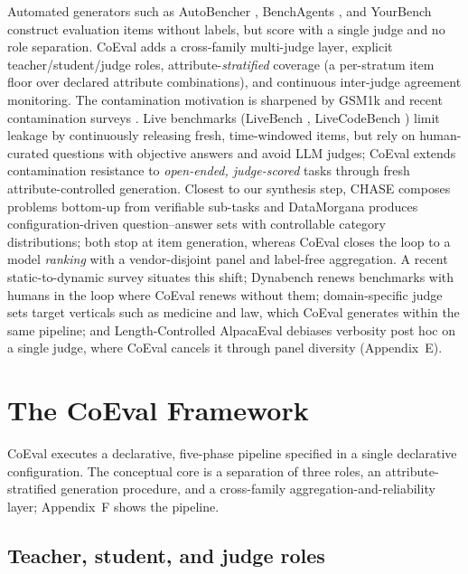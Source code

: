 \documentclass[11pt,a4paper]{article}
\begin{document}
Automated generators such as AutoBencher \citep{ref9}, BenchAgents \citep{ref10}, and YourBench
\citep{ref11} construct evaluation items without labels, but score with a single judge and no role
separation. CoEval adds a cross-family multi-judge layer, explicit teacher/student/judge roles,
attribute-\emph{stratified} coverage (a per-stratum item floor over declared attribute combinations), and continuous
inter-judge agreement monitoring. The contamination motivation is sharpened by GSM1k \citep{ref12} and recent
contamination surveys \citep{ref13}. Live benchmarks (LiveBench \citep{ref22}, LiveCodeBench
\citep{ref23}) limit leakage by continuously releasing fresh, time-windowed items, but rely on
human-curated questions with objective answers and avoid LLM judges; CoEval extends contamination resistance to
\emph{open-ended, judge-scored} tasks through fresh attribute-controlled generation. Closest to our synthesis step,
CHASE \citep{ref30} composes problems bottom-up from verifiable sub-tasks and DataMorgana
\citep{ref31} produces configuration-driven question--answer sets with controllable category
distributions; both stop at item generation, whereas CoEval closes the loop to a model \emph{ranking} with a
vendor-disjoint panel and label-free aggregation. A recent static-to-dynamic survey \citep{ref32} situates
this shift; Dynabench \citep{ref14} renews benchmarks with humans in the loop where CoEval renews without
them; domain-specific judge sets \citep{ref25} target verticals such as medicine and law, which CoEval
generates within the same pipeline; and Length-Controlled AlpacaEval \citep{ref8} debiases verbosity post hoc
on a single judge, where CoEval cancels it through panel diversity (Appendix~E).

\section{The CoEval Framework}\label{the-coeval-framework}

CoEval executes a declarative, five-phase pipeline specified in a single declarative configuration. The conceptual core is a
separation of three roles, an attribute-stratified generation procedure, and a cross-family aggregation-and-reliability
layer; Appendix~F shows the pipeline.

\subsection{Teacher, student, and judge roles}\label{teacher-student-and-judge-roles}
\end{document}
